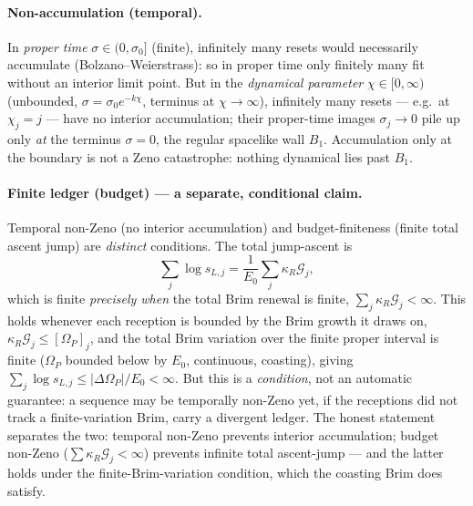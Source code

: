 \documentclass[11pt,a4paper]{article}
\theoremstyle{plain}
\theoremstyle{definition}
\theoremstyle{remark}
\begin{document}
\paragraph{Non-accumulation (temporal).} In \emph{proper time} $\sigma\in(0,\sigma_0]$ (finite),
infinitely many resets would necessarily accumulate (Bolzano--Weierstrass): so in proper time only
finitely many fit without an interior limit point. But in the \emph{dynamical parameter}
$\chi\in[0,\infty)$ (unbounded, $\sigma=\sigma_0e^{-k\chi}$, terminus at $\chi\to\infty$), infinitely
many resets --- e.g.\ at $\chi_j=j$ --- have no interior accumulation; their proper-time images
$\sigma_j\to0$ pile up only \emph{at} the terminus $\sigma=0$, the regular spacelike wall $B_1$.
Accumulation only at the boundary is not a Zeno catastrophe: nothing dynamical lies past $B_1$.

\paragraph{Finite ledger (budget) --- a separate, conditional claim.} Temporal non-Zeno (no interior
accumulation) and budget-finiteness (finite total ascent jump) are \emph{distinct} conditions. The
total jump-ascent is
\begin{equation}
\sum_j\log s_{L,j}=\frac1{E_0}\sum_j\kappa_R\mathcal G_j,
\end{equation}
which is finite \emph{precisely when} the total Brim renewal is finite, $\sum_j\kappa_R\mathcal G_j<\infty$.
This holds whenever each reception is bounded by the Brim growth it draws on,
$\kappa_R\mathcal G_j\le[\Omega_P]_j$, and the total Brim variation over the finite proper interval is
finite ($\Omega_P$ bounded below by $E_0$, continuous, coasting), giving
$\sum_j\log s_{L,j}\le|\Delta\Omega_P|/E_0<\infty$. But this is a \emph{condition}, not an automatic
guarantee: a sequence may be temporally non-Zeno yet, if the receptions did not track a finite-variation
Brim, carry a divergent ledger. The honest statement separates the two: temporal non-Zeno prevents
interior accumulation; budget non-Zeno ($\sum\kappa_R\mathcal G_j<\infty$) prevents infinite total
ascent-jump --- and the latter holds under the finite-Brim-variation condition, which the coasting
Brim does satisfy.
\end{document}
